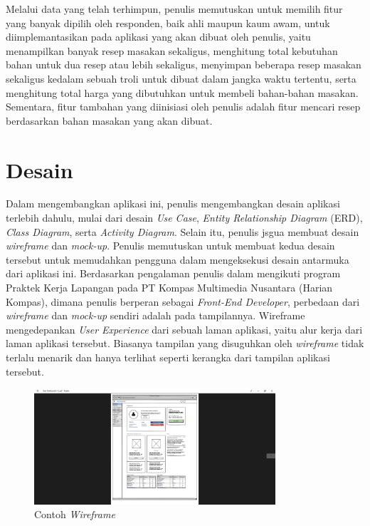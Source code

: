 	Melalui data yang telah terhimpun, penulis memutuskan untuk memilih fitur yang banyak dipilih oleh responden, baik ahli maupun kaum awam, untuk diimplemantasikan pada aplikasi yang akan dibuat oleh penulis, yaitu menampilkan banyak resep masakan sekaligus, menghitung total kebutuhan bahan untuk dua resep atau lebih sekaligus, menyimpan beberapa resep masakan sekaligus kedalam sebuah troli untuk dibuat dalam jangka waktu tertentu, serta menghitung total harga yang dibutuhkan untuk membeli bahan-bahan masakan. Sementara, fitur tambahan yang diinisiasi oleh penulis adalah fitur mencari resep berdasarkan bahan masakan yang akan dibuat.
	
\section{Desain}
	Dalam mengembangkan aplikasi ini, penulis mengembangkan desain aplikasi terlebih dahulu, mulai dari desain \emph{Use Case}, \emph{Entity Relationship Diagram} (ERD), \emph{Class Diagram}, serta \emph{Activity Diagram}. Selain itu, penulis jsgua membuat desain \textit{wireframe} dan \textit{mock-up}. Penulis memutuskan untuk membuat kedua desain tersebut untuk memudahkan pengguna dalam mengeksekusi desain antarmuka dari aplikasi ini. Berdasarkan pengalaman penulis dalam mengikuti program Praktek Kerja Lapangan pada PT Kompas Multimedia Nusantara (Harian Kompas), dimana penulis berperan sebagai \textit{Front-End Developer}, perbedaan dari \textit{wireframe} dan \textit{mock-up} sendiri adalah pada tampilannya. Wireframe mengedepankan \textit{User Experience} dari sebuah laman aplikasi, yaitu alur kerja dari laman aplikasi tersebut. Biasanya tampilan yang disuguhkan oleh \textit{wireframe} tidak terlalu menarik dan hanya terlihat seperti kerangka dari tampilan aplikasi tersebut. 
	\begin{figure}[H]
		\centering
		\includegraphics[origin=c,width=0.8\textwidth]{gambar/kompas/wireframe}
		\caption{Contoh \emph{Wireframe}}
	\end{figure}
